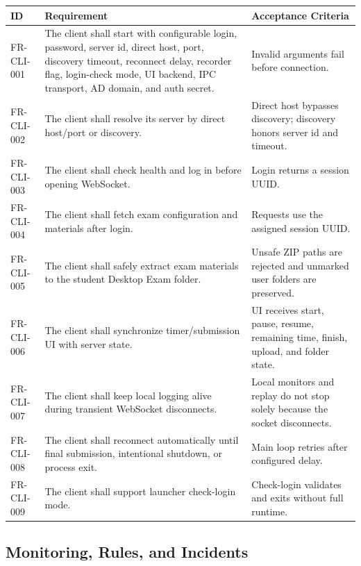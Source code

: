 \documentclass[12pt,a4paper]{article}
\begin{document}
\begin{longtable}{L{0.15\textwidth} L{0.47\textwidth} L{0.28\textwidth}}
\textbf{ID} & \textbf{Requirement} & \textbf{Acceptance Criteria} \\
\hline
FR-CLI-001 & The client shall start with configurable login, password, server id, direct host, port, discovery timeout, reconnect delay, recorder flag, login-check mode, UI backend, IPC transport, AD domain, and auth secret. & Invalid arguments fail before connection. \\
FR-CLI-002 & The client shall resolve its server by direct host/port or discovery. & Direct host bypasses discovery; discovery honors server id and timeout. \\
FR-CLI-003 & The client shall check health and log in before opening WebSocket. & Login returns a session UUID. \\
FR-CLI-004 & The client shall fetch exam configuration and materials after login. & Requests use the assigned session UUID. \\
FR-CLI-005 & The client shall safely extract exam materials to the student Desktop Exam folder. & Unsafe ZIP paths are rejected and unmarked user folders are preserved. \\
FR-CLI-006 & The client shall synchronize timer/submission UI with server state. & UI receives start, pause, resume, remaining time, finish, upload, and folder state. \\
FR-CLI-007 & The client shall keep local logging alive during transient WebSocket disconnects. & Local monitors and replay do not stop solely because the socket disconnects. \\
FR-CLI-008 & The client shall reconnect automatically until final submission, intentional shutdown, or process exit. & Main loop retries after configured delay. \\
FR-CLI-009 & The client shall support launcher check-login mode. & Check-login validates and exits without full runtime. \\
\end{longtable}

\subsection{Monitoring, Rules, and Incidents}
\end{document}
